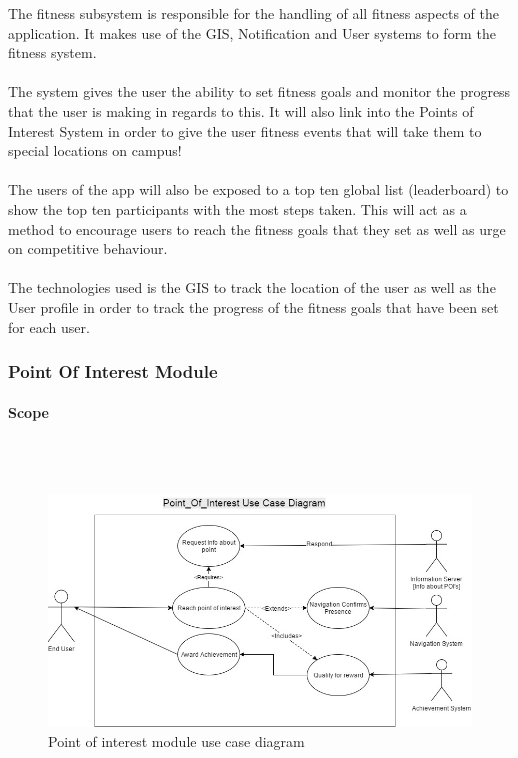\documentclass{article}
\begin{document}
			{The fitness subsystem is responsible for the handling of all fitness aspects of the application. It makes use of the GIS, Notification and User systems to form the fitness system.\\\\The system gives the user the ability to set fitness goals and monitor the progress that the user is making in regards to this. It will also link into the Points of Interest System in order to give the user fitness events that will take them to special locations on campus!\\\\The users of the app will also be exposed to a top ten global list (leaderboard) to show the top ten participants with the most steps taken. This will act as a method to encourage users to reach the fitness goals that they set as well as urge on competitive behaviour.\\\\The technologies used is the GIS to track the location of the user as well as the User profile in order to track the progress of the fitness goals that have been set for each user.}		
		
		\subsubsection{Point Of Interest Module}
				\paragraph {Scope}\mbox{} \\\\
				\begin{figure}[h]
			            \includegraphics[width=\textwidth]{./Images/POI_Usecase.jpg} 
			            \caption{Point of interest module use case diagram}
			        \end{figure}
\end{document}
